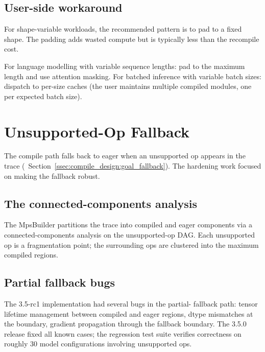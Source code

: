 \subsection{User-side workaround}
\label{ssec:compile_hardening:dyn_workaround}

For shape-variable workloads, the recommended pattern is to pad
to a fixed shape. The padding adds wasted compute but is
typically less than the recompile cost.

For language modelling with variable sequence lengths: pad to
the maximum length and use attention masking. For batched
inference with variable batch sizes: dispatch to per-size
caches (the user maintains multiple compiled modules, one per
expected batch size).

\section{Unsupported-Op Fallback}
\label{sec:compile_hardening:unsupported_fallback}

The compile path falls back to eager when an unsupported op
appears in the trace
(~Section~\ref{ssec:compile_design:goal_fallback}).
The hardening work focused on making the fallback robust.

\subsection{The connected-components analysis}
\label{ssec:compile_hardening:cc_analysis}

The MpsBuilder partitions the trace into compiled and eager
components via a connected-components analysis on the
unsupported-op DAG. Each unsupported op is a fragmentation
point; the surrounding ops are clustered into the maximum
compiled regions.

\subsection{Partial fallback bugs}
\label{ssec:compile_hardening:partial_fallback}

The 3.5-rc1 implementation had several bugs in the partial-
fallback path: tensor lifetime management between compiled and
eager regions, dtype mismatches at the boundary, gradient
propagation through the fallback boundary. The 3.5.0 release
fixed all known cases; the regression test suite verifies
correctness on roughly 30 model configurations involving
unsupported ops.


